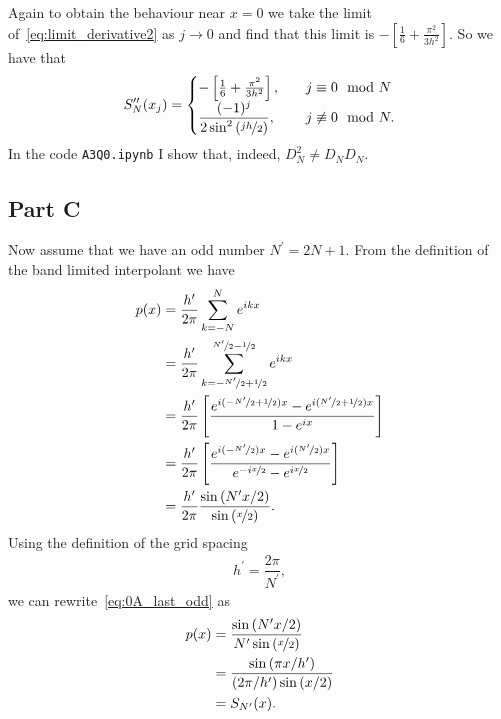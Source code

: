 \documentclass[12pt]{article}
\begin{document}
Again to obtain the behaviour near $x=0$ we take the limit of~\eqref{eq:limit_derivative2} as $j\to 0$ and find that this limit is $-\left[\frac{1}{6}+\frac{\pi^{2}}{3h^{2}}\right]$. So we have that
\begin{align}
	S_{N}^{\prime\prime}(x_{j}) = 
	\begin{cases}
		-\left[\frac{1}{6}+\frac{\pi^{2}}{3h^{2}}\right],&\quad j\equiv 0 \mod N\\
		\dfrac{(-1)^{j}}{2\sin^{2}\left(\nicefrac{jh}{2}\right)},&\quad j\not\equiv 0\mod N.
	\end{cases}
\end{align}
In the code \verb|A3Q0.ipynb| I show that, indeed, $D_{N}^{2} \neq D_{N}D_{N}$.

\subsection*{Part C}
Now assume that we have an odd number $N^{\prime} = 2N+1$. From the definition of the band limited interpolant we have
\begin{subequations}
    \begin{align}
        p(x) &= \dfrac{h^{\prime}}{2\pi}\sum\limits_{k=-N}^{N}e^{ikx}\\
        &= \dfrac{h^{\prime}}{2\pi}\sum\limits_{k=-\nicefrac{N^{\prime}}{2}+\nicefrac{1}{2}}^{\nicefrac{N^{\prime}}{2}-\nicefrac{1}{2}}e^{ikx}\\
        &= \dfrac{h^{\prime}}{2\pi}\left[\dfrac{e^{i(-\nicefrac{N^{\prime}}{2}+\nicefrac{1}{2})x}-e^{i(\nicefrac{N^{\prime}}{2}+\nicefrac{1}{2})x}}{1-e^{ix}}\right]\\
        &= \dfrac{h^{\prime}}{2\pi}\left[\dfrac{e^{i(-\nicefrac{N^{\prime}}{2})x}-e^{i(\nicefrac{N^{\prime}}{2})x}}{e^{-i\nicefrac{x}{2}}-e^{i\nicefrac{x}{2}}}\right]\\
        &= \dfrac{h^{\prime}}{2\pi}\dfrac{\sin\left(N^{\prime}x/2\right)}{\sin\left(\nicefrac{x}{2}\right)}.\label{eq:0A_last_odd}
    \end{align}
\end{subequations}
Using the definition of the grid spacing 
\begin{align}
    h^{\prime} = \dfrac{2\pi}{N^{\prime}},
\end{align}
we can rewrite~\eqref{eq:0A_last_odd} as
\begin{subequations}
    \begin{align}
        p(x) &= \dfrac{\sin\left(N^{\prime}x/2\right)}{N^{\prime}\sin\left(\nicefrac{x}{2}\right)}\\
        &= \dfrac{\sin\left(\pi x/h^{\prime}\right)}{\left(2\pi/h^{\prime}\right)\sin\left(x/2\right)}\\
        &= S_{N^{\prime}}(x).
    \end{align}
\end{subequations}
\end{document}
